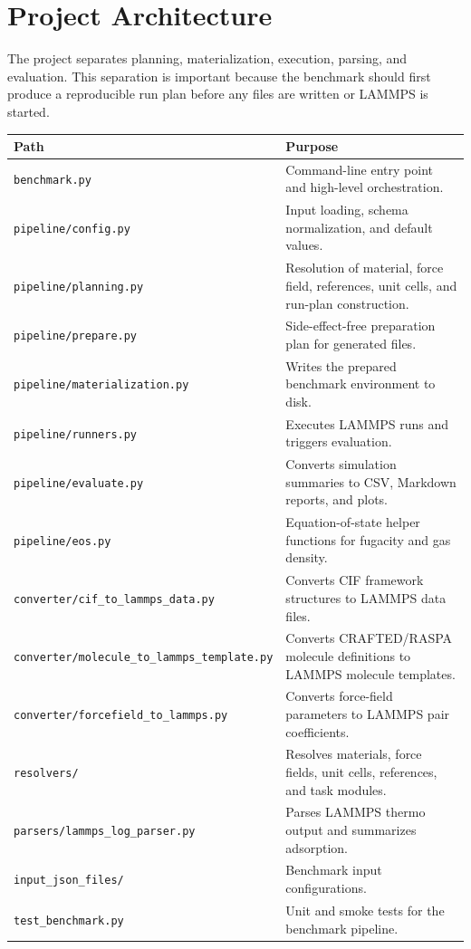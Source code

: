 \section{Project Architecture}

The project separates planning, materialization, execution, parsing, and evaluation.
This separation is important because the benchmark should first produce a reproducible run plan before any files are written or LAMMPS is started.

\begin{longtable}{p{}p{}}
\toprule
\textbf{Path} & \textbf{Purpose} \\
\midrule
\texttt{benchmark.py} & Command-line entry point and high-level orchestration. \\
\texttt{pipeline/config.py} & Input loading, schema normalization, and default values. \\
\texttt{pipeline/planning.py} & Resolution of material, force field, references, unit cells, and run-plan construction. \\
\texttt{pipeline/prepare.py} & Side-effect-free preparation plan for generated files. \\
\texttt{pipeline/materialization.py} & Writes the prepared benchmark environment to disk. \\
\texttt{pipeline/runners.py} & Executes LAMMPS runs and triggers evaluation. \\
\texttt{pipeline/evaluate.py} & Converts simulation summaries to CSV, Markdown reports, and plots. \\
\texttt{pipeline/eos.py} & Equation-of-state helper functions for fugacity and gas density. \\
\texttt{converter/cif\_to\_lammps\_data.py} & Converts CIF framework structures to LAMMPS data files. \\
\texttt{converter/molecule\_to\_lammps\_template.py} & Converts CRAFTED/RASPA molecule definitions to LAMMPS molecule templates. \\
\texttt{converter/forcefield\_to\_lammps.py} & Converts force-field parameters to LAMMPS pair coefficients. \\
\texttt{resolvers/} & Resolves materials, force fields, unit cells, references, and task modules. \\
\texttt{parsers/lammps\_log\_parser.py} & Parses LAMMPS thermo output and summarizes adsorption. \\
\texttt{input\_json\_files/} & Benchmark input configurations. \\
\texttt{test\_benchmark.py} & Unit and smoke tests for the benchmark pipeline. \\
\bottomrule
\end{longtable}

